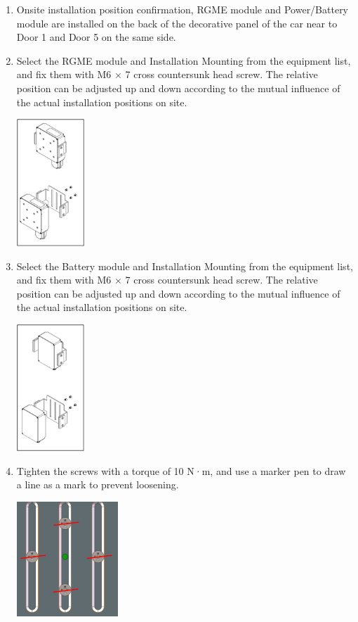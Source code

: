 \documentclass{article}
\begin{document}
\begin{enumerate}
    \item Onsite installation position confirmation, RGME module and Power/Battery module are installed on the back of the decorative panel of the car near to Door 1 and Door 5 on the same side.
    \item Select the RGME module and Installation Mounting from the equipment list, and fix them with M6 × 7 cross countersunk head screw. The relative position can be adjusted up and down according to the mutual influence of the actual installation positions on site.\\
    \begin{center}
        \includegraphics[width=0.2\textwidth]{RGME Mounting.png}
    \end{center}
    \item Select the Battery module and Installation Mounting from the equipment list, and fix them with M6 × 7 cross countersunk head screw. The relative position can be adjusted up and down according to the mutual influence of the actual installation positions on site.\\     
    \begin{center}
        \includegraphics[width=0.2\textwidth]{Battery Mounting.png}
    \end{center}
    \item Tighten the screws with a torque of 10 N·m, and use a marker pen to draw a line as a mark to prevent loosening.\\
    \begin{center}
        \includegraphics[width=0.3\textwidth]{Mark1.png}
    \end{center}
\end{enumerate}
\end{document}
